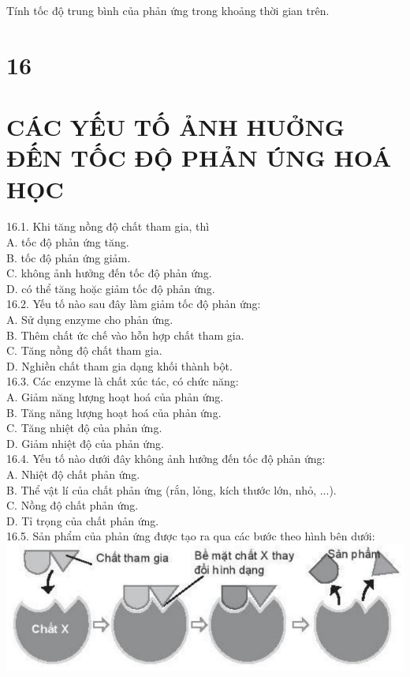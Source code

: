 \documentclass[10pt]{article}
\begin{document}
Tính tốc độ trung bình của phản ứng trong khoảng thời gian trên.

\section*{16}
\section*{CÁC YẾU TỐ ẢNH HUỞNG ĐẾN TỐC ĐỘ PHẢN ÚNG HOÁ HỌC}
16.1. Khi tăng nồng độ chất tham gia, thì\\
A. tốc độ phản ứng tăng.\\
B. tốc độ phản ứng giảm.\\
C. không ảnh hưởng đến tốc độ phản ứng.\\
D. có thể tăng hoặc giảm tốc độ phản ứng.\\
16.2. Yếu tố nào sau đây làm giảm tốc độ phản ứng:\\
A. Sử dụng enzyme cho phản ứng.\\
B. Thêm chất ức chế vào hỗn hợp chất tham gia.\\
C. Tăng nồng độ chất tham gia.\\
D. Nghiền chất tham gia dạng khối thành bột.\\
16.3. Các enzyme là chất xúc tác, có chức năng:\\
A. Giảm năng lượng hoạt hoá của phản ứng.\\
B. Tăng năng lượng hoạt hoá của phản ứng.\\
C. Tăng nhiệt độ của phản ứng.\\
D. Giảm nhiệt độ của phản ứng.\\
16.4. Yếu tố nào dưới đây không ảnh hưởng đến tốc độ phản ứng:\\
A. Nhiệt độ chất phản ứng.\\
B. Thể vật lí của chất phản ứng (rắn, lỏng, kích thước lớn, nhỏ, ...).\\
C. Nồng độ chất phản ứng.\\
D. Tỉ trọng của chất phản ứng.\\
16.5. Sản phẩm của phản ứng được tạo ra qua các bước theo hình bên dưới:\\
\includegraphics[max width=\textwidth, center]{2025_10_23_883c4b146e2332109fcdg-62}
\end{document}
